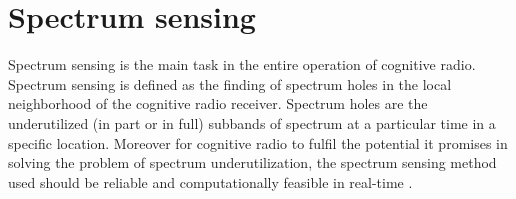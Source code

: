 \chapter{Spectrum sensing}

Spectrum sensing is the main task in the entire operation of cognitive
radio. Spectrum sensing is defined as the finding of spectrum holes in 
the local neighborhood of the cognitive radio receiver. Spectrum holes are the
underutilized (in part or in full) subbands of spectrum at a particular time
in a specific location. Moreover for cognitive radio to fulfil the potential
it promises in solving the problem of spectrum underutilization, the spectrum 
sensing method used should be reliable and computationally
feasible in real-time \cite{haykin09}.